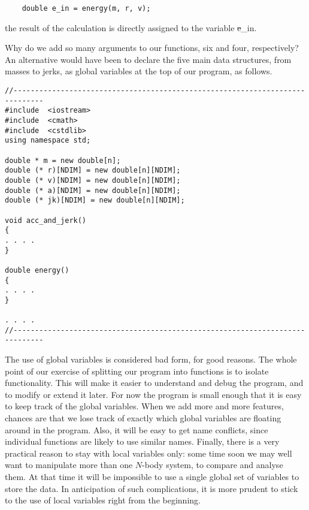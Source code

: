 \begin{small}
\begin{verbatim}
    double e_in = energy(m, r, v);
\end{verbatim}
\end{small}

\noindent
the result of the calculation is directly assigned to the variable
{\st e\_in}.

Why do we add so many arguments to our functions, six and four,
respectively?  An alternative would have been to declare the five main
data structures, from masses to jerks, as global variables at the top
of our program, as follows.

\begin{Code}
\begin{small}
\begin{verbatim}
//-----------------------------------------------------------------------------
#include  <iostream>
#include  <cmath>
#include  <cstdlib>
using namespace std;

double * m = new double[n];
double (* r)[NDIM] = new double[n][NDIM];
double (* v)[NDIM] = new double[n][NDIM];
double (* a)[NDIM] = new double[n][NDIM];
double (* jk)[NDIM] = new double[n][NDIM];

void acc_and_jerk()
{
. . . .
}

double energy()
{
. . . .
}

. . . .
//-----------------------------------------------------------------------------
\end{verbatim}
\end{small}
\end{Code}

The use of global variables is considered bad form, for good reasons.
The whole point of our exercise of splitting our program into
functions is to isolate functionality.  This will make it easier to
understand and debug the program, and to modify or extend it later.
For now the program is small enough that it is easy to keep track of
the global variables.  When we add more and more features, chances are
that we lose track of exactly which global variables are floating
around in the program.  Also, it will be easy to get name conflicts,
since individual functions are likely to use similar names.  Finally,
there is a very practical reason to stay with local variables only:
some time soon we may well want to manipulate more than one $N$-body
system, to compare and analyse them.  At that time it will be impossible
to use a single global set of variables to store the data.  In
anticipation of such complications, it is more prudent to stick to the
use of local variables right from the beginning.

